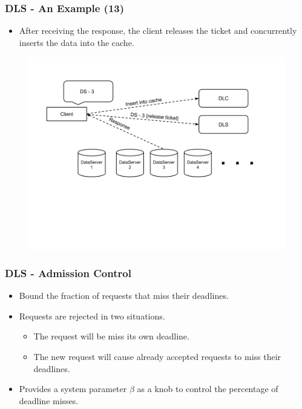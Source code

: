 \documentclass{beamer}
\begin{document}
\begin{frame}
  \frametitle{DLS - An Example (13)}
  \begin{itemize}
  \item After receiving the response, the client releases
    the ticket and concurrently inserts the data into the cache.
  \end{itemize}
  \begin{figure}
    \begin{center}
      \centerline{\includegraphics[scale=0.35]{img/DLS_Example12.png}}
    \end{center}
  \end{figure}
\end{frame}


\begin{frame}
  \frametitle{DLS - Admission Control}
  \begin{itemize}
  \item Bound the fraction of requests that miss their deadlines.
  \item Requests are rejected in two situations.
    \begin{itemize}
    \item The request will be miss its own deadline.
    \item The new request will cause already accepted requests to miss their deadlines.
    \end{itemize}
  \item Provides a system parameter $\beta$ as a knob to control the percentage
    of deadline misses.
  \end{itemize}
\end{frame}
\end{document}
